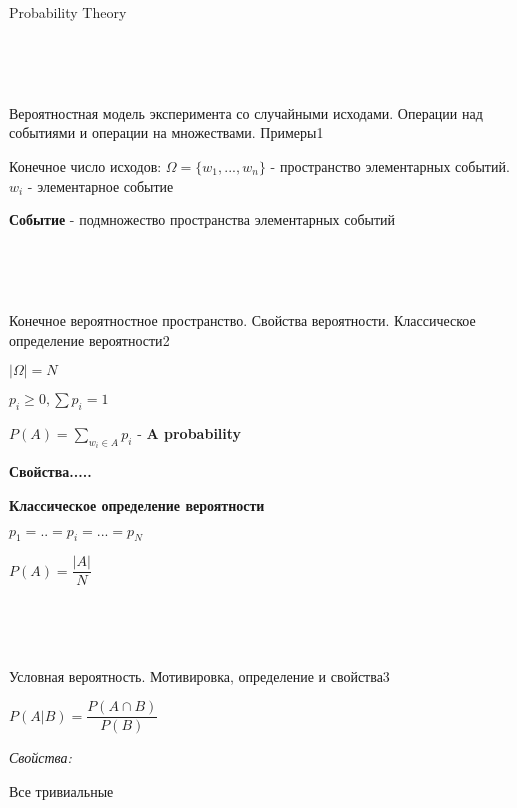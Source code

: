 \documentclass{article}
\begin{document}
\begin{center}

\Huge Probability Theory

\end{center}

~\

~\

\begin{question}{Вероятностная модель эксперимента со случайными исходами. Операции над событиями и операции на множествами. Примеры}{1}

Конечное число исходов: $\Omega = \{w_1, ..., w_n\}$ - пространство элементарных событий. $w_i$ - элементарное событие

\textbf{Событие} - подмножество пространства элементарных событий

\end{question}

~\

~\


\begin{question}{Конечное вероятностное пространство. Свойства вероятности. Классическое определение вероятности}{2}

$|\Omega| = N$

$p_i \geq 0, \sum{p_i} = 1$

$P(A) = \sum\limits_{w_i \in A}{p_i}$ - \textbf{A probability}

\textbf{Свойства.....}

\textbf{Классическое определение вероятности}

$p_1 = .. = p_i = ... = p_N$

$P(A) = \dfrac{|A|}{N}$


\end{question}

~\

~\


\begin{question}{Условная вероятность. Мотивировка, определение и свойства}{3}

$P(A | B) = \dfrac{P(A \cap B)}{P(B)}$

\textit{Свойства:}

Все тривиальные

\end{question}

~\

~\
\end{document}
